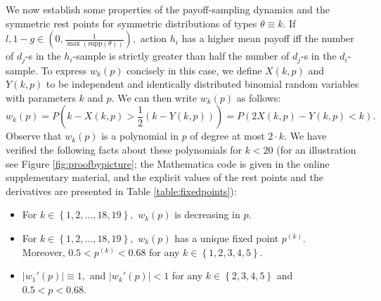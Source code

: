 \documentclass[12pt]{article}
\numberwithin{equation}{section}
\numberwithin{figure}{section}
\theoremstyle{definition}
\theoremstyle{plain}
\theoremstyle{plain}
\theoremstyle{plain}
\theoremstyle{remark}
\theoremstyle{plain}
\theoremstyle{plain}
\begin{document}

We now establish some properties of the payoff-sampling dynamics and the symmetric rest points for symmetric distributions of types $\theta \equiv k$. 
If $l,1-g \in \left(0, \frac{1}{\max(\textrm{supp}(\theta))}\right),$ action $h_i$ has a higher mean payoff iff the number of $d_j$-s in the $h_i$-sample is strictly greater than half the number of $d_j$-s in the $d_i$-sample. To express $w_k(p)$ concisely in this case, we define $X(k,p)$ and $Y(k,p)$ to be independent and identically distributed binomial random variables with parameters $k$ and $p.$ We can then write $w_k(p)$ as follows:
\begin{equation}
w_k(p) = P\left(k-X(k,p) > \frac{1}{2}(k-Y(k,p))\right)= P(2X(k,p)-Y(k,p) < k).
\end{equation}
Observe that $w_k(p)$ is a polynomial in $p$ of degree at most $2\cdot k.$ We have verified the following facts about these polynomials for $k<20$ (for an illustration see Figure \ref{fig:proofbypicture}; the Mathematica code is given in the online supplementary material, and the explicit values of the rest points and the derivatives are presented in Table \ref{table:fixedpoints}):
\begin{itemize}
    \item For $k \in \left\{1,2,\dots,18,19\right\},$ $w_k(p)$ is decreasing in $p.$
    \item For $k \in \left\{1,2,\dots,18,19\right\},$ $w_k(p)$ has a unique fixed point $p^{(k)}$.\\
    Moreover, $0.5 < p^{(k)} < 0.68$ for any $k \in \left\{1,2,3,4,5\right\}.$ 
    \item $|w_1'(p)| \equiv 1,$ and $|w_k'(p)| < 1$ for any $k \in \left\{2,3,4,5\right\}$ and $0.5<p<0.68.$ 
\end{itemize}
\end{document}
